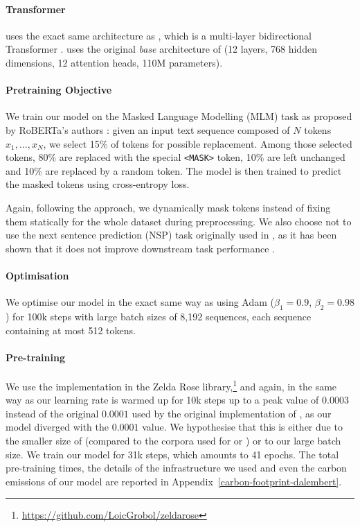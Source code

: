 \paragraph{Transformer}
\dalembert uses the exact same architecture as \roberta, which is a multi-layer bidirectional Transformer \cite{vaswani-etal-2017-attention}.
\dalembert uses the original \emph{base} architecture of \roberta (12 layers, 768 hidden dimensions, 12 attention heads, 110M parameters).

\paragraph{Pretraining Objective}
We train our model on the Masked Language Modelling (MLM) task as proposed by RoBERTa's authors \cite{liu-etal-2019-roberta}: given an input text sequence composed of $N$ tokens $x_1, ..., x_N$, we select 15\% of tokens for possible replacement. Among those selected tokens, 80\% are replaced with the special \texttt{<MASK>} token, 10\% are left unchanged and 10\% are replaced by a random token. The model is then trained to predict the masked tokens using cross-entropy loss.

Again, following the \roberta approach, we dynamically mask tokens instead of fixing them statically for the whole dataset during preprocessing. We also choose not to use the next sentence prediction (NSP) task originally used in \bert \cite{devlin-etal-2019-bert}, as it has been shown that it does not improve downstream task performance \cite{conneau-lample-2019-cross,liu-etal-2019-roberta}.

\paragraph{Optimisation}
We optimise our model in the exact same way as \cite{liu-etal-2019-roberta} using Adam \cite{kingma-ba-2015-adam} ($\beta_1 = 0.9$, $\beta_2 = 0.98$) for 100k steps with large batch sizes of 8,192 sequences, each sequence containing at most 512 tokens.

\paragraph{Pre-training}
We use the \roberta implementation in the Zelda Rose library,\footnote{\url{https://github.com/LoicGrobol/zeldarose}} and again, in the same way as  our learning rate is warmed up for 10k steps up to a peak value of $0.0003$ instead of the original $0.0001$ used by the original implementation of \roberta \cite{liu-etal-2019-roberta}, as our model diverged with the $0.0001$ value. We hypothesise that this is either due to the smaller size of \freemmax (compared to the corpora used for \roberta or \camembert) or to our large batch size. We train our model for 31k steps, which amounts to 41 epochs. The total pre-training times, the details of the infrastructure we used and even the carbon emissions of our model are reported in Appendix~\ref{carbon-footprint-dalembert}.

